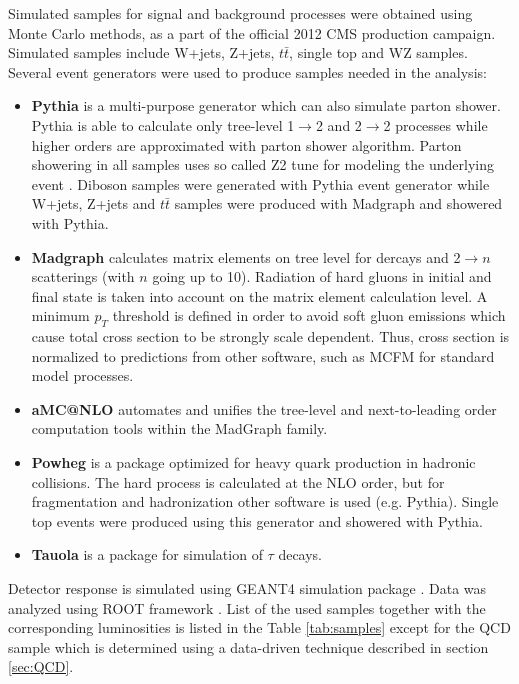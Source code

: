\par Simulated samples for signal and background processes were obtained using Monte Carlo methods, as a part of the official 2012 CMS production campaign. Simulated samples include W+jets, Z+jets, $t\bar{t}$, single top and WZ samples. Several event generators were used to produce samples needed in the analysis:
\begin{itemize}
\item \textbf{Pythia} \cite{Sjostrand:2006za,Sjostrand:2007gs} is a multi-purpose generator which can also simulate parton shower. Pythia is able to calculate only tree-level 1$\rightarrow$2 and 2$\rightarrow$2 processes while higher orders are approximated with parton shower algorithm. Parton showering in all samples uses so called Z2 tune for modeling the underlying event \cite{Field:2010bc,Chatrchyan:2013ala}. Diboson samples were generated with Pythia event generator while W+jets, Z+jets and $t\bar{t}$ samples were produced with Madgraph and showered with Pythia.  
\item \textbf{Madgraph} \cite{Alwall:2011uj} calculates matrix elements on tree level for dercays and 2$\rightarrow n$ scatterings (with $n$ going up to 10). Radiation of hard gluons in initial and final state is taken into account on the matrix element calculation level. A minimum $p_T$ threshold is defined in order to avoid soft gluon emissions which cause total cross section to be strongly scale dependent. Thus, cross section is normalized to predictions from other software, such as MCFM\cite{Campbell:2010ff} for standard model processes.   
\item \textbf{aMC@NLO} \cite{Alwall:2014hca} automates and unifies the tree-level and next-to-leading order computation tools within the MadGraph family.
\item \textbf{Powheg} \cite{Oleari:2010nx} is a package optimized for heavy quark production in hadronic collisions. The hard process is calculated at the NLO order, but for fragmentation and hadronization other software is used (e.g. Pythia). Single top events were produced using this generator and showered with Pythia. 
\item \textbf{Tauola} \cite{Jadach:1993hs} is a package for simulation of $\tau$ decays.
\end{itemize}
        
Detector response is simulated using GEANT4 simulation package \cite{Agostinelli:2002hh}. Data was analyzed using ROOT framework \cite{Brun:1997pa}. List of the used samples together with the corresponding luminosities is listed in the Table \ref{tab:samples} except for the QCD sample which is determined using a data-driven technique described in section \ref{sec:QCD}.

